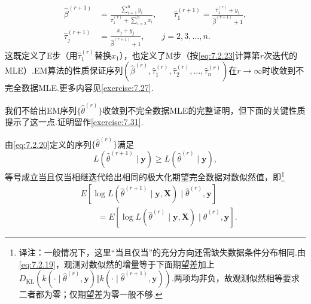 \begin{example}
\begin{equation}\label{eq:7.2.23}
\begin{aligned}
\widehat\beta^{(r+1)}&=\frac{\sum_{i=1}^ny_i}{\tau_1^{(r)}+\sum_{i=2}^nx_i},\qquad
\widehat\tau_1^{(r+1)}=\frac{\widehat\tau_1^{(r)}+y_1}{\widehat\beta^{(r+1)}+1},\\
\widehat\tau_j^{(r+1)}&=\frac{x_j+y_j}{\widehat\beta^{(r+1)}+1},\qquad j=2,3,\ldots,n.
\end{aligned}
\end{equation}
这既定义了E步（用$\widehat\tau_1^{(r)}$替换$x_1$），也定义了M步（按\eqref{eq:7.2.23}计算第$r$次迭代的\mbox{MLE）.}EM算法的性质保证序列$(\widehat\beta^{(r)},\widehat\tau_1^{(r)},\widehat\tau_2^{(r)},\ldots,\widehat\tau_n^{(r)})$在$r\to\infty$时收敛到不完全数据MLE.更多内容见\autoref{exercise:7.27}.
\end{example}
我们不给出EM序列$\{\widehat\theta^{(r)}\}$收敛到不完全数据MLE的完整证明，但下面的关键性质提示了这一点.证明留作\autoref{exercise:7.31}.
\begin{theorem}[单调EM序列]\label{thm:7.2.20}
由\eqref{eq:7.2.20}定义的序列$\{\widehat\theta^{(r)}\}$满足
\begin{equation}\label{eq:7.2.24}
L(\widehat\theta^{(r+1)}\mid\boldsymbol y)\ge L(\widehat\theta^{(r)}\mid\boldsymbol y),
\end{equation}
等号成立当且仅当相继迭代给出相同的极大化期望完全数据对数似然值，即\footnote{译注：一般情况下，这里“当且仅当”的充分方向还需缺失数据条件分布相同.由\eqref{eq:7.2.19}，观测对数似然的增量等于下面期望差加上$D_{\mathrm{KL}}(k(\cdot\mid\widehat\theta^{(r)},\boldsymbol y)\Vert k(\cdot\mid\widehat\theta^{(r+1)},\boldsymbol y))$.两项均非负，故观测似然相等要求二者都为零；仅期望差为零一般不够.}
\begin{align*}
&E[\log L(\widehat\theta^{(r+1)}\mid\boldsymbol y,\boldsymbol X)\mid\widehat\theta^{(r)},\boldsymbol y]\\
&\qquad=E[\log L(\widehat\theta^{(r)}\mid\boldsymbol y,\boldsymbol X)\mid\widehat\theta^{(r)},\boldsymbol y].
\end{align*}
\end{theorem}
